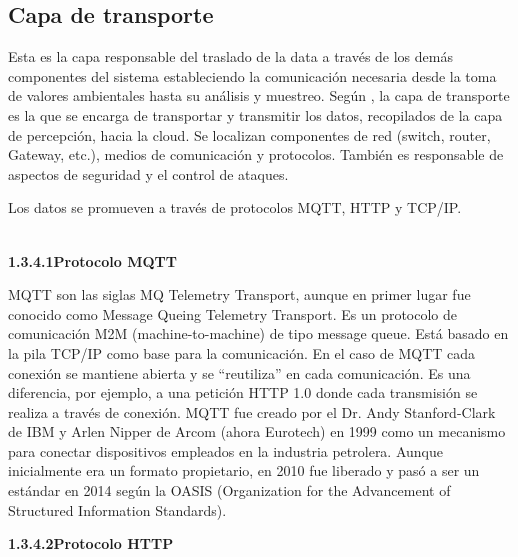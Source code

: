     \subsection{Capa de transporte}\label{subsec:capa_transporte}

    Esta es la capa responsable del traslado de la data a través de los demás componentes del sistema estableciendo la comunicación necesaria desde la toma de valores ambientales hasta su análisis y muestreo.    
    Según \cite{internetOfThingsStateOfTheArt}, la capa de transporte es la que se encarga de transportar y transmitir los datos, recopilados de la capa de percepción, hacia la cloud. Se localizan componentes de red (switch, router, Gateway, etc.), medios de comunicación y protocolos. También es responsable de aspectos de seguridad y el control de ataques.
    
    Los datos se promueven a través de protocolos MQTT, HTTP y TCP/IP.\\\\
    
        \textbf{1.3.4.1\hspace{5mm}Protocolo MQTT}

    MQTT son las siglas MQ Telemetry Transport, aunque en primer lugar fue conocido como Message Queing Telemetry Transport. Es un protocolo de comunicación M2M (machine-to-machine) de tipo message queue. Está basado en la pila TCP/IP como base para la comunicación. En el caso de MQTT cada conexión se mantiene abierta y se “reutiliza” en cada comunicación. Es una diferencia, por ejemplo, a una petición HTTP 1.0 donde cada transmisión se realiza a través de conexión.
    MQTT fue creado por el Dr. Andy Stanford-Clark de IBM y Arlen Nipper de Arcom (ahora Eurotech) en 1999 como un mecanismo para conectar dispositivos empleados en la industria petrolera.
    Aunque inicialmente era un formato propietario, en 2010 fue liberado y pasó a ser un estándar en 2014 según la OASIS (Organization for the Advancement of Structured Information Standards). \cite{mqtt}\\

        \textbf{1.3.4.2\hspace{5mm}Protocolo HTTP}


